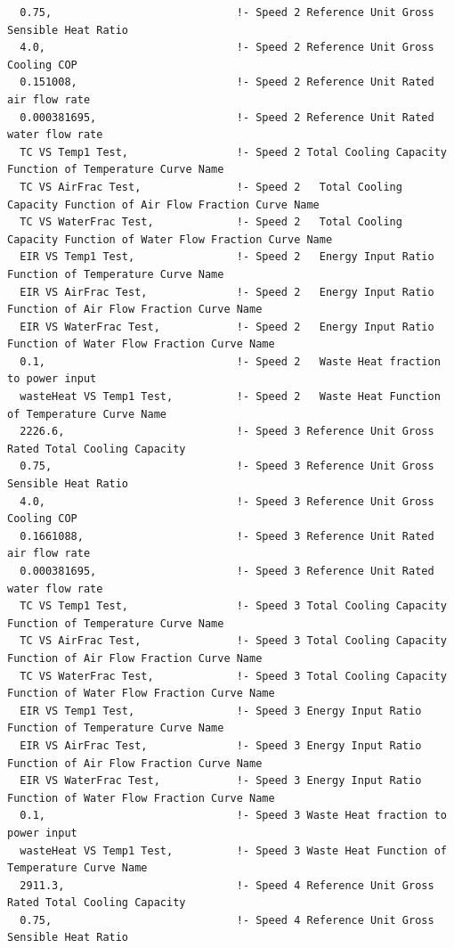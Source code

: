 \begin{lstlisting}
  0.75,                             !- Speed 2 Reference Unit Gross Sensible Heat Ratio
  4.0,                              !- Speed 2 Reference Unit Gross Cooling COP
  0.151008,                         !- Speed 2 Reference Unit Rated air flow rate
  0.000381695,                      !- Speed 2 Reference Unit Rated water flow rate
  TC VS Temp1 Test,                 !- Speed 2 Total Cooling Capacity Function of Temperature Curve Name
  TC VS AirFrac Test,               !- Speed 2   Total Cooling Capacity Function of Air Flow Fraction Curve Name
  TC VS WaterFrac Test,             !- Speed 2   Total Cooling Capacity Function of Water Flow Fraction Curve Name
  EIR VS Temp1 Test,                !- Speed 2   Energy Input Ratio Function of Temperature Curve Name
  EIR VS AirFrac Test,              !- Speed 2   Energy Input Ratio Function of Air Flow Fraction Curve Name
  EIR VS WaterFrac Test,            !- Speed 2   Energy Input Ratio Function of Water Flow Fraction Curve Name
  0.1,                              !- Speed 2   Waste Heat fraction to power input
  wasteHeat VS Temp1 Test,          !- Speed 2   Waste Heat Function of Temperature Curve Name
  2226.6,                           !- Speed 3 Reference Unit Gross Rated Total Cooling Capacity
  0.75,                             !- Speed 3 Reference Unit Gross Sensible Heat Ratio
  4.0,                              !- Speed 3 Reference Unit Gross Cooling COP
  0.1661088,                        !- Speed 3 Reference Unit Rated air flow rate
  0.000381695,                      !- Speed 3 Reference Unit Rated water flow rate
  TC VS Temp1 Test,                 !- Speed 3 Total Cooling Capacity Function of Temperature Curve Name
  TC VS AirFrac Test,               !- Speed 3 Total Cooling Capacity Function of Air Flow Fraction Curve Name
  TC VS WaterFrac Test,             !- Speed 3 Total Cooling Capacity Function of Water Flow Fraction Curve Name
  EIR VS Temp1 Test,                !- Speed 3 Energy Input Ratio Function of Temperature Curve Name
  EIR VS AirFrac Test,              !- Speed 3 Energy Input Ratio Function of Air Flow Fraction Curve Name
  EIR VS WaterFrac Test,            !- Speed 3 Energy Input Ratio Function of Water Flow Fraction Curve Name
  0.1,                              !- Speed 3 Waste Heat fraction to power input
  wasteHeat VS Temp1 Test,          !- Speed 3 Waste Heat Function of Temperature Curve Name
  2911.3,                           !- Speed 4 Reference Unit Gross Rated Total Cooling Capacity
  0.75,                             !- Speed 4 Reference Unit Gross Sensible Heat Ratio

\end{lstlisting}

